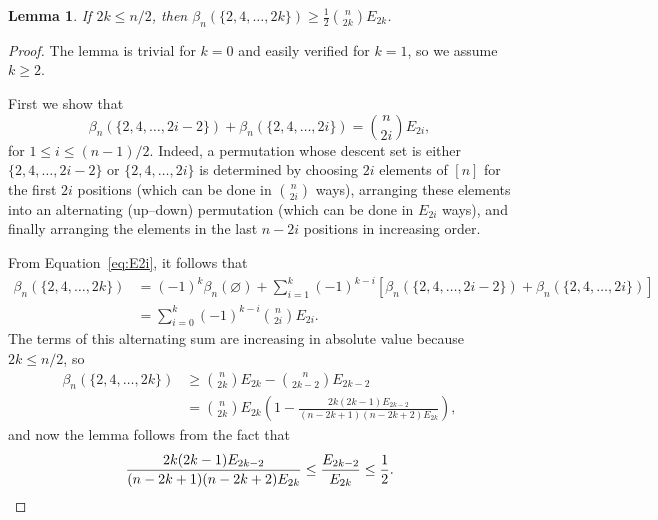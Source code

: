 \documentclass[12pt]{article}
\newtheorem{lem}[thm]{Lemma}
\theoremstyle{definition}
\begin{document}
\begin{lem} \label{EulerBound}
If $2k \le n/2$, then $\beta_n(\{2, 4, \ldots, 2k\}) \ge \frac12 \binom{n}{2k} E_{2k}$.
\end{lem}

 \begin{proof}
The lemma is trivial for $k=0$ and easily verified for $k=1$, so we assume $k\ge2$.

First we show that 
\begin{equation}\label{eq:E2i} \beta_n(\{2, 4, \ldots, 2i-2\}) + \beta_n(\{2, 4, \ldots, 2i\}) = \binom{n}{2i} E_{2i}, 
\end{equation}
for $1 \le i \le (n-1)/2$. Indeed, a permutation whose descent set is either $\{2, 4, \ldots, 2i-2\}$ or $\{2, 4, \ldots, 2i\}$ is determined by choosing $2i$ elements of $[n]$ for the first $2i$ positions (which can be done in $\binom{n}{2i}$ ways), arranging these elements into an alternating (up--down) permutation (which can be done in $E_{2i}$ ways), and finally arranging the elements in the last $n-2i$ positions in increasing order. 

From Equation~\eqref{eq:E2i}, it follows that
\begin{align*}
 \beta_n(\{2, 4, \ldots, 2k\}) &= (-1)^k\beta_n(\varnothing) + \sum_{i=1}^k (-1)^{k-i} \left[ \beta_n(\{2, 4, \ldots, 2i-2\}) + \beta_n(\{2, 4, \ldots, 2i\}) \right] \\
&%
= \sum_{i=0}^k (-1)^{k-i} \binom{n}{2i} E_{2i}.
\end{align*}
The terms of this alternating sum are increasing in absolute value because $2k \le n/2$, so
\begin{align*}
\beta_n(\{2, 4, \ldots, 2k\}) &\ge \binom{n}{2k} E_{2k} - \binom{n}{2k-2} E_{2k-2} \\
&= \binom{n}{2k} E_{2k} \left(1 - \frac{2k(2k-1)E_{2k-2}}{(n-2k+1)(n-2k+2)E_{2k}} \right),
\end{align*}
and now the lemma follows from the fact that 
\[ \frac{2k(2k-1)E_{2k-2}}{(n-2k+1)(n-2k+2)E_{2k}} \le \frac{E_{2k-2}}{E_{2k}}\le\frac{1}{2}.\qedhere \]
\end{proof}
\end{document}
